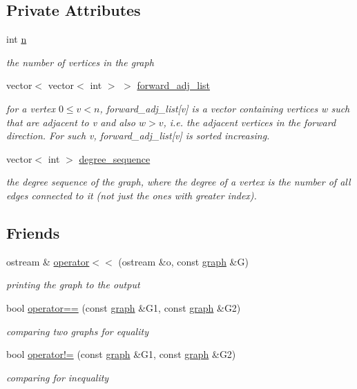 \subsection*{Private Attributes}
\begin{DoxyCompactItemize}
\item 
int \hyperlink{classgraph_ac8b3474ce95c04087c312508ec1443b6}{n}
\begin{DoxyCompactList}\small\item\em the number of vertices in the graph \end{DoxyCompactList}\item 
vector$<$ vector$<$ int $>$ $>$ \hyperlink{classgraph_a7d6441850d586d6a99fb73df57b70362}{forward\+\_\+adj\+\_\+list}
\begin{DoxyCompactList}\small\item\em for a vertex $0 \leq v < n$, forward\+\_\+adj\+\_\+list\mbox{[}v\mbox{]} is a vector containing vertices w such that are adjacent to v and also $w > v$, i.\+e. the adjacent vertices in the forward direction. For such v, forward\+\_\+adj\+\_\+list\mbox{[}v\mbox{]} is sorted increasing. \end{DoxyCompactList}\item 
vector$<$ int $>$ \hyperlink{classgraph_a0b31295672bfe37669c9eb3640977fe6}{degree\+\_\+sequence}
\begin{DoxyCompactList}\small\item\em the degree sequence of the graph, where the degree of a vertex is the number of all edges connected to it (not just the ones with greater index). \end{DoxyCompactList}\end{DoxyCompactItemize}
\subsection*{Friends}
\begin{DoxyCompactItemize}
\item 
ostream \& \hyperlink{classgraph_abe8832440fa24b6a6c152dbc3736c908}{operator$<$$<$} (ostream \&o, const \hyperlink{classgraph}{graph} \&G)
\begin{DoxyCompactList}\small\item\em printing the graph to the output \end{DoxyCompactList}\item 
bool \hyperlink{classgraph_a156c8acaca113a7e5cc8d918dd1fc3f3}{operator==} (const \hyperlink{classgraph}{graph} \&G1, const \hyperlink{classgraph}{graph} \&G2)
\begin{DoxyCompactList}\small\item\em comparing two graphs for equality \end{DoxyCompactList}\item 
bool \hyperlink{classgraph_a004e2b491d4bafaf2d8129e6bc8abc2e}{operator!=} (const \hyperlink{classgraph}{graph} \&G1, const \hyperlink{classgraph}{graph} \&G2)
\begin{DoxyCompactList}\small\item\em comparing for inequality \end{DoxyCompactList}\end{DoxyCompactItemize}


